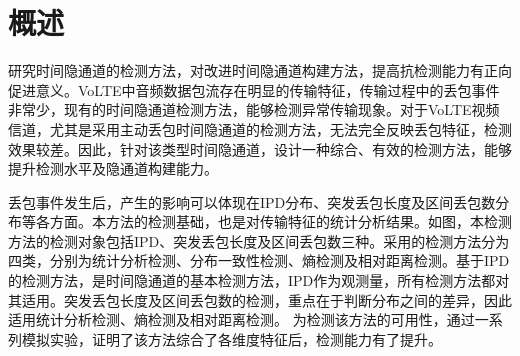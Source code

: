 \section{概述}
\label{chap:analyze:overview}

研究时间隐通道的检测方法，对改进时间隐通道构建方法，提高抗检测能力有正向促进意义。VoLTE中音频数据包流存在明显的传输特征，传输过程中的丢包事件非常少，现有的时间隐通道检测方法，能够检测异常传输现象。对于VoLTE视频信道，尤其是采用主动丢包时间隐通道的检测方法，无法完全反映丢包特征，检测效果较差。因此，针对该类型时间隐通道，设计一种综合、有效的检测方法，能够提升检测水平及隐通道构建能力。


丢包事件发生后，产生的影响可以体现在IPD分布、突发丢包长度及区间丢包数分布等各方面。本方法的检测基础，也是对传输特征的统计分析结果。如图，本检测方法的检测对象包括IPD、突发丢包长度及区间丢包数三种。采用的检测方法分为四类，分别为统计分析检测、分布一致性检测、熵检测及相对距离检测。基于IPD的检测方法，是时间隐通道的基本检测方法，IPD作为观测量，所有检测方法都对其适用。突发丢包长度及区间丢包数的检测，重点在于判断分布之间的差异，因此适用统计分析检测、熵检测及相对距离检测。
为检测该方法的可用性，通过一系列模拟实验，证明了该方法综合了各维度特征后，检测能力有了提升。